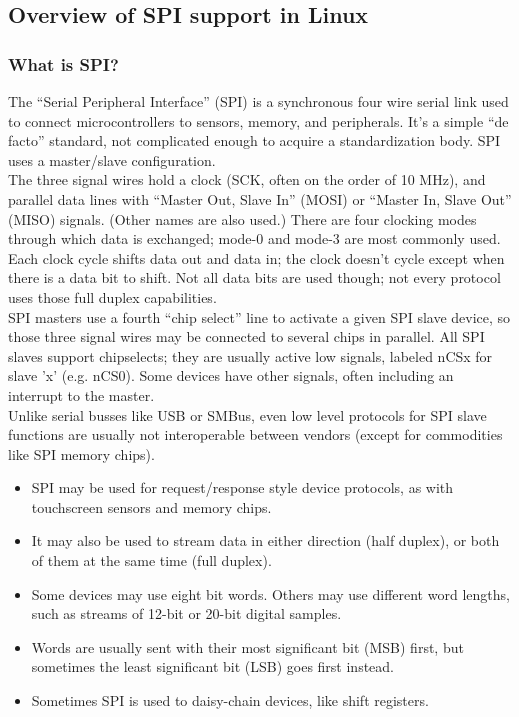 \subsection{Overview of SPI support in Linux}
\subsubsection{What is SPI?}
The ``Serial Peripheral Interface'' (SPI) is a synchronous four wire serial link used to connect microcontrollers to sensors, memory, and peripherals. It's a simple ``de facto'' standard, not complicated enough to acquire a standardization body.  SPI uses a master/slave configuration.\\
The three signal wires hold a clock (SCK, often on the order of 10 MHz), and parallel data lines with ``Master Out, Slave In'' (MOSI) or ``Master In, Slave Out'' (MISO) signals.  (Other names are also used.)  There are four clocking modes through which data is exchanged; mode-0 and mode-3 are most commonly used.  Each clock cycle shifts data out and data in; the clock doesn't cycle except when there is a data bit to shift.  Not all data bits are used though; not every protocol uses those full duplex capabilities.\\
SPI masters use a fourth ``chip select'' line to activate a given SPI slave device, so those three signal wires may be connected to several chips in parallel.  All SPI slaves support chipselects; they are usually active low signals, labeled nCSx for slave 'x' (e.g. nCS0).  Some devices have other signals, often including an interrupt to the master. \\
Unlike serial busses like USB or SMBus, even low level protocols for SPI slave functions are usually not interoperable between vendors (except for commodities like SPI memory chips).
\begin{itemize}
	\item SPI may be used for request/response style device protocols, as with touchscreen sensors and memory chips.
	\item It may also be used to stream data in either direction (half duplex), or both of them at the same time (full duplex).
	\item Some devices may use eight bit words.  Others may use different word     lengths, such as streams of 12-bit or 20-bit digital samples.
	\item Words are usually sent with their most significant bit (MSB) first, but sometimes the least significant bit (LSB) goes first instead.
	\item Sometimes SPI is used to daisy-chain devices, like shift registers.
\end{itemize}
